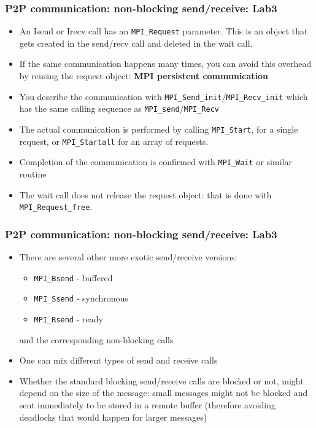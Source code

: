 \documentclass{beamer}
\begin{document}
\begin{frame}[fragile]
  \frametitle{P2P communication: non-blocking send/receive: Lab3}
\begin{itemize}
\item An Isend or Irecv call has an {\color{mycolorcode}\verb|MPI_Request|} parameter. This is an object that gets created in the send/recv call and deleted in the wait call.
\item If the same communication happens many times, you can avoid this overhead by reusing the request object: {\color{mycolordef}\textbf{MPI persistent communication}}
\item You describe the communication with {\color{mycolorcode}\verb|MPI_Send_init|}/{\color{mycolorcode}\verb|MPI_Recv_init|} which has the same calling sequence as {\color{mycolorcode}\verb|MPI_send|}/{\color{mycolorcode}\verb|MPI_Recv|}
\item The actual communication is performed by calling {\color{mycolorcode}\verb|MPI_Start|}, for a single request, or {\color{mycolorcode}\verb|MPI_Startall|} for an array of requests.
\item Completion of the communication is confirmed with {\color{mycolorcode}\verb|MPI_Wait|} or similar routine
\item The wait call does not release the request object: that is done with {\color{mycolorcode}\verb|MPI_Request_free|}. 
\end{itemize}
\end{frame}

\begin{frame}[fragile]
  \frametitle{P2P communication: non-blocking send/receive: Lab3}
\begin{itemize}
\item There are several other more exotic send/receive versions: 
\begin{itemize}
\item {\color{mycolorcode}\verb|MPI_Bsend|} - buffered
\item {\color{mycolorcode}\verb|MPI_Ssend|} - synchronous 
\item {\color{mycolorcode}\verb|MPI_Rsend|} - ready 
\end{itemize}
and the corresponding non-blocking calls
\item One can mix different types of send and receive calls
\item Whether the standard blocking send/receive calls are blocked or not, might depend on the size of the message: 
small messages might not be blocked and sent immediately to be stored in a remote buffer (therefore avoiding deadlocks that would happen for larger messages)
\end{itemize}
\end{frame}
\end{document}
